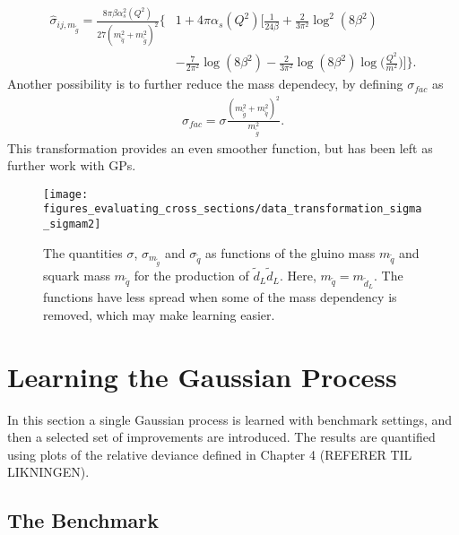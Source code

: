 \documentclass[twoside,english]{uiofysmaster}
\begin{document}
\begin{align}
\hat{\sigma}_{ij, m_{\tilde{g}}} =  \frac{8 \pi \beta \alpha^2_s (Q^2)}{27(m_{\tilde{q}}^2 + m_{\tilde{g}}^2)^2} \Bigg\{&1 
 + 4 \pi \alpha_s (Q^2) \Bigg[ \frac{1}{24 \beta} 
 + \frac{2}{3 \pi^2} \log^2(8 \beta^2)\\& - \frac{7}{2 \pi^2} \log (8 \beta^2)
- \frac{2}{3 \pi^2} \log (8 \beta^2) \log \Big( \frac{Q^2}{m^2} \Big) \Bigg] \Bigg\}.
\end{align}
Another possibility is to further reduce the mass dependecy, by defining $\sigma_{fac}$ as 
\begin{align}
\sigma_{fac} = \sigma \frac{(m_{\tilde{g}}^2 + m_{\tilde{q}}^2)^2}{m_{\tilde{g}}^2}.
\end{align}
This transformation provides an even smoother function, but has been left as further work with GPs.

\begin{figure}
\centering
\texttt{[image: figures\_evaluating\_cross\_sections/data\_transformation\_sigma\_sigmam2]}
\caption{The quantities $\sigma$, $\sigma_{m_{\tilde{g}}}$ and $\sigma_{\tilde{q}}$ as functions of the gluino mass $m_{\tilde{q}}$ and squark mass $m_{\tilde{q}}$ for the production of $\tilde{d}_L \tilde{d}_L$. Here, $m_{\tilde{q}} = m_{\tilde{d}_L}$. The functions have less spread when some of the mass dependency is removed, which may make learning easier.}
\label{Fig:: evaluating cross : Comparison sigma and sigma/m}
\end{figure}

\section{Learning the Gaussian Process}

In this section a single Gaussian process is learned with benchmark settings, and then a selected set of improvements are introduced. The results are quantified using plots of the relative deviance defined in Chapter 4 (REFERER TIL LIKNINGEN).

\subsection{The Benchmark}
\end{document}
